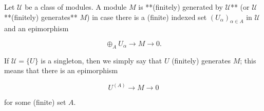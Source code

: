 Let $\mathcal{U}$ be a class of modules. A module $M$ is **(finitely) generated by $\mathcal{U}$** (or $\mathcal{U}$ **(finitely) generates** $M$) in case there is a (finite) indexed set $(U_\alpha)_{\alpha \in A}$ in $\mathcal{U}$ and an epimorphism

$$\oplus_A U_\alpha \rightarrow M \rightarrow 0.$$

If $\mathcal{U} = \{U\}$ is a singleton, then we simply say that $U$ (finitely) generates $M$; this means that there is an epimorphism

$$U^{(A)} \rightarrow M \rightarrow 0$$

for some (finite) set $A$.
